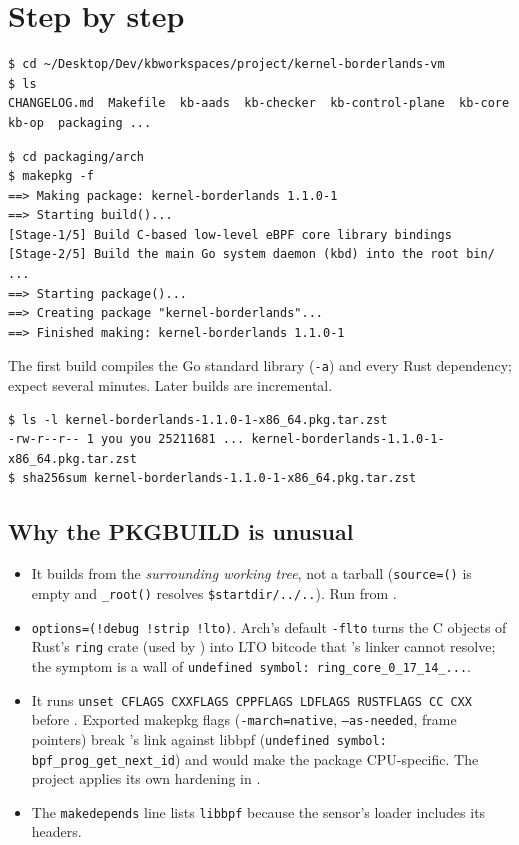\section{Step by step}
\resetsteps
{}
\begin{lstlisting}[style=console]
$ cd ~/Desktop/Dev/kbworkspaces/project/kernel-borderlands-vm
$ ls
CHANGELOG.md  Makefile  kb-aads  kb-checker  kb-control-plane  kb-core  kb-op  packaging ...
\end{lstlisting}

\begin{lstlisting}[style=console]
$ cd packaging/arch
$ makepkg -f
==> Making package: kernel-borderlands 1.1.0-1
==> Starting build()...
[Stage-1/5] Build C-based low-level eBPF core library bindings
[Stage-2/5] Build the main Go system daemon (kbd) into the root bin/
...
==> Starting package()...
==> Creating package "kernel-borderlands"...
==> Finished making: kernel-borderlands 1.1.0-1
\end{lstlisting}
The first build compiles the Go standard library (\texttt{-a}) and every Rust dependency; expect several
minutes. Later builds are incremental.

\begin{lstlisting}[style=console]
$ ls -l kernel-borderlands-1.1.0-1-x86_64.pkg.tar.zst
-rw-r--r-- 1 you you 25211681 ... kernel-borderlands-1.1.0-1-x86_64.pkg.tar.zst
$ sha256sum kernel-borderlands-1.1.0-1-x86_64.pkg.tar.zst
\end{lstlisting}

\subsection{Why the PKGBUILD is unusual}
\begin{itemize}
\item It builds from the \emph{surrounding working tree}, not a tarball (\texttt{source=()} is empty and \texttt{\_root()} resolves \texttt{\$startdir/../..}). Run  from .
\item \texttt{options=(!debug !strip !lto)}. Arch's default \texttt{-flto} turns the C objects of Rust's \texttt{ring} crate (used by ) into LTO bitcode that 's linker cannot resolve; the symptom is a wall of \texttt{undefined symbol: ring\_core\_0\_17\_14\_...}.
\item It runs \texttt{unset CFLAGS CXXFLAGS CPPFLAGS LDFLAGS RUSTFLAGS CC CXX} before . Exported makepkg flags (\texttt{-march=native}, \texttt{--as-needed}, frame pointers) break 's link against libbpf (\texttt{undefined symbol: bpf\_prog\_get\_next\_id}) and would make the package CPU-specific. The project applies its own hardening in .
\item The \texttt{makedepends} line lists \texttt{libbpf} because the sensor's loader includes its headers.
\end{itemize}

